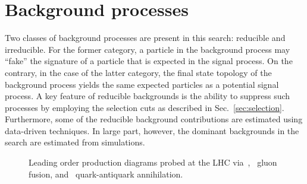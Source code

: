 \chapter{Background processes}
\label{chap:backgrounds}

Two classes of background processes are present in this search: reducible and irreducible. For the former category, a particle in the background process may ``fake'' the signature of a particle that is expected in the signal process. On the contrary, in the case of the latter category, the final state topology of the background process yields the same expected particles as a potential signal process. A key feature of reducible backgrounds is the ability to suppress such processes by employing the selection cuts as described in Sec.~\ref{sec:selection}. Furthermore, some of the reducible background contributions are estimated using data-driven techniques. In large part, however, the dominant backgrounds in the search are estimated from simulations.

\begin{figure}
  \begin{center}
    \hspace{0.5cm}
    \hspace{0.5cm}
  \end{center}
  \caption{Leading order \ttbar production diagrams probed at the LHC via~\protect{},~\protect{} gluon fusion, and~\protect{} quark-antiquark annihilation.}
\label{fig:tt2l_feyn}
\end{figure}

\section{\ttll}

